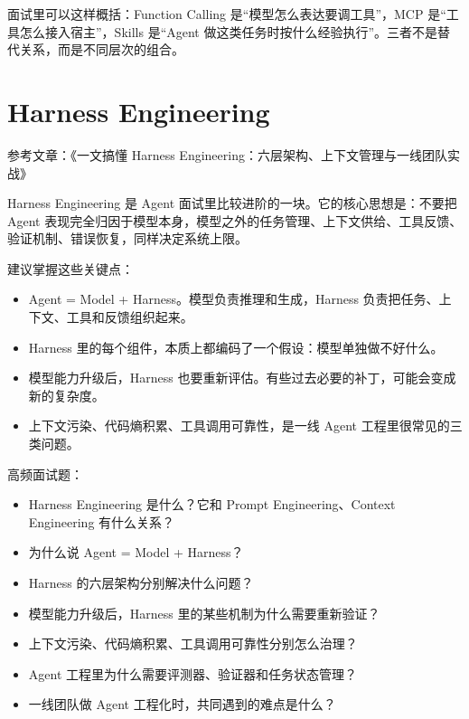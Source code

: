 \documentclass[9pt,a4paper,twocolumn]{ctexart}
\begin{document}
面试里可以这样概括：Function Calling 是“模型怎么表达要调工具”，MCP 是“工具怎么接入宿主”，Skills 是“Agent 做这类任务时按什么经验执行”。三者不是替代关系，而是不同层次的组合。



\section*{Harness Engineering}


参考文章：《一文搞懂 Harness Engineering：六层架构、上下文管理与一线团队实战》



Harness Engineering 是 Agent 面试里比较进阶的一块。它的核心思想是：不要把 Agent 表现完全归因于模型本身，模型之外的任务管理、上下文供给、工具反馈、验证机制、错误恢复，同样决定系统上限。



建议掌握这些关键点：


\begin{itemize}[itemsep=1pt, topsep=2pt]
  \item Agent = Model + Harness。模型负责推理和生成，Harness 负责把任务、上下文、工具和反馈组织起来。
  \item Harness 里的每个组件，本质上都编码了一个假设：模型单独做不好什么。
  \item 模型能力升级后，Harness 也要重新评估。有些过去必要的补丁，可能会变成新的复杂度。
  \item 上下文污染、代码熵积累、工具调用可靠性，是一线 Agent 工程里很常见的三类问题。
\end{itemize}


高频面试题：


\begin{itemize}[itemsep=1pt, topsep=2pt]
  \item Harness Engineering 是什么？它和 Prompt Engineering、Context Engineering 有什么关系？
  \item 为什么说 Agent = Model + Harness？
  \item Harness 的六层架构分别解决什么问题？
  \item 模型能力升级后，Harness 里的某些机制为什么需要重新验证？
  \item 上下文污染、代码熵积累、工具调用可靠性分别怎么治理？
  \item Agent 工程里为什么需要评测器、验证器和任务状态管理？
  \item 一线团队做 Agent 工程化时，共同遇到的难点是什么？
\end{itemize}
\end{document}
